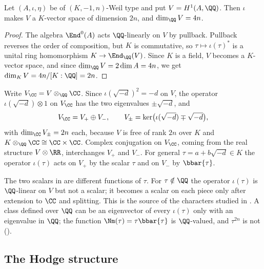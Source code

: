 \begin{lemma}[$H^{1}$ is a $K$-space]\label{lem:Kspace}
Let $(A,\iota,\eta)$ be of $(K,-1,n)$-Weil type and put $V=H^{1}(A,\QQ)$. Then
$\iota$ makes $V$ a $K$-vector space of dimension $2n$, and
$\dim_{\QQ}V=4n$.
\end{lemma}

\begin{proof}
The algebra $\End^{0}(A)$ acts $\QQ$-linearly on $V$ by pullback. Pullback
reverses the order of composition, but $K$ is commutative, so
$\tau\mapsto\iota(\tau)^{*}$ is a unital ring homomorphism
$K\to\End_{\QQ}(V)$. Since $K$ is a field, $V$ becomes a $K$-vector space,
and since $\dim_{\QQ}V=2\dim A=4n$, we get $\dim_{K}V=4n/[K:\QQ]=2n$.
\end{proof}

\begin{notation}\label{not:eigen}
Write $V_{\CC}=V\otimes_{\QQ}\CC$. Since $\iota(\sqrt{-d})^{2}=-d$ on $V$,
the operator $\iota(\sqrt{-d})\otimes1$ on $V_{\CC}$ has the two
eigenvalues $\pm\sqrt{-d}$, and
\begin{equation}\label{eq:Vsplit}
  V_{\CC}=V_{+}\oplus V_{-},
  \qquad
  V_{\pm}=\ker\bigl(\iota(\sqrt{-d})\mp\sqrt{-d}\bigr),
\end{equation}
with $\dim_{\CC}V_{\pm}=2n$ each, because $V$ is free of rank $2n$ over $K$ and
$K\otimes_{\QQ}\CC\cong\CC\times\CC$. Complex conjugation on $V_{\CC}$, coming
from the real structure $V\otimes\RR$, interchanges $V_{+}$ and $V_{-}$. For
general $\tau=a+b\sqrt{-d}\in K$ the operator $\iota(\tau)$ acts on $V_{+}$ by
the scalar $\tau$ and on $V_{-}$ by $\bbar{\tau}$.
\end{notation}

\begin{remark}\label{rem:tautbar}
The two scalars in  are different functions of $\tau$. For
$\tau\notin\QQ$ the operator $\iota(\tau)$ is $\QQ$-linear on $V$ but not a
scalar; it becomes a scalar on each piece only after extension to $\CC$ and
splitting. This is the source of the characters studied in
. A class defined over $\QQ$ can be an eigenvector of
every $\iota(\tau)$ only with an eigenvalue in $\QQ$; the function
$\Nm(\tau)=\tau\bbar{\tau}$ is $\QQ$-valued, and $\tau^{2n}$ is not
().
\end{remark}

\subsection{The Hodge structure}

